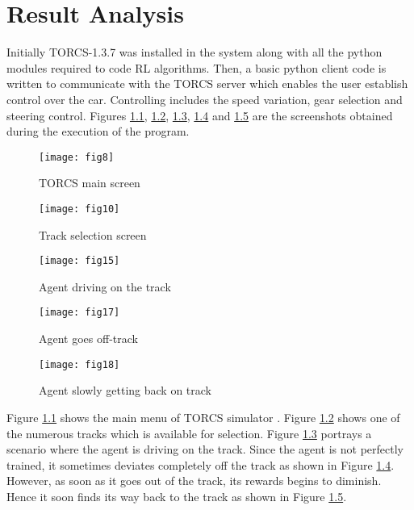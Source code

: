 \chapter{Result Analysis}

Initially TORCS-1.3.7 was installed in the system along with all the python modules required to code RL algorithms. Then, a basic python client code is written to communicate with the TORCS server which enables the user establish control over the car. Controlling includes the speed variation, gear selection and steering control. Figures \ref{fig:mainscr}, \ref{fig:tracksel}, \ref{fig:ontrack}, \ref{fig:offtrack} and \ref{fig:offtrack2} are the screenshots obtained during the execution of the program. \\


\begin{figure}[h]
	\centering
	\texttt{[image: fig8]}
	\caption{TORCS main screen}
	\label{fig:mainscr}
\end{figure}

\pagebreak
\newpage

\begin{figure}[h]
	\centering
	\texttt{[image: fig10]}
	\caption{Track selection screen}
	\label{fig:tracksel}
\end{figure}


\begin{figure}[h]
	\centering
	\texttt{[image: fig15]}
	\caption{Agent driving on the track}
	\label{fig:ontrack}
\end{figure}

\begin{figure}[h]
	\centering
	\texttt{[image: fig17]}
	\caption{Agent goes off-track}
	\label{fig:offtrack}
\end{figure}

\newpage
\begin{figure}[h]
	\centering
	\texttt{[image: fig18]}
	\caption{Agent slowly getting back on track}
	\label{fig:offtrack2}
\end{figure}

Figure \ref{fig:mainscr} shows the main menu of TORCS simulator .
Figure \ref{fig:tracksel} shows one of the numerous tracks which is available for selection. 
Figure \ref{fig:ontrack} portrays a scenario where the agent is driving on the track. 
Since the agent is not perfectly trained, it sometimes deviates completely off the track as shown in Figure \ref{fig:offtrack}.
However, as soon as it goes out of the track, its rewards begins to diminish. Hence it soon finds its way back to the track as shown in Figure \ref{fig:offtrack2}. 

